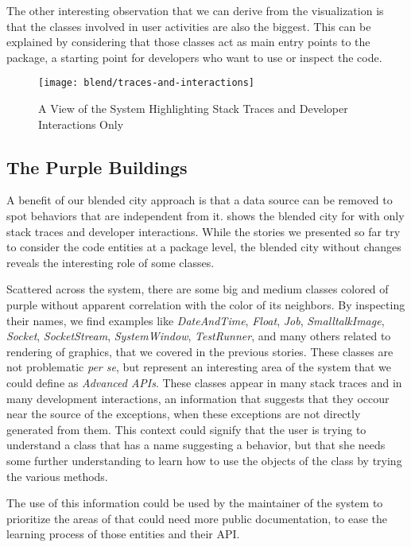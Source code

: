 The other interesting observation that we can derive from the visualization is that the  classes involved in user activities are also the biggest.
This can be explained by considering that those classes act as main entry points to the package, a starting point for developers who want to use or inspect the code.


\begin{figure*}[ht]
\centering
\texttt{[image: blend/traces-and-interactions]}
\caption{A View of the System Highlighting Stack Traces and Developer Interactions Only}
\label{fig:traces-and-interactions}
\end{figure*}

\subsection{The Purple Buildings}

A benefit of our blended city approach is that a data source can be removed to spot behaviors that are independent from it.
 shows the blended city for \pha with only stack traces and developer interactions.
While the stories we presented so far try to consider the code entities at a package level,  the blended city without changes reveals the interesting role of some classes.

 Scattered across the system, there are some big and medium classes colored of purple without apparent correlation with the color of its neighbors.
By inspecting their names, we find examples like \textit{DateAndTime}, \textit{Float}, \textit{Job}, \textit{SmalltalkImage}, \textit{Socket}, \textit{SocketStream},  \textit{SystemWindow}, \textit{TestRunner}, and many others related to rendering of graphics, that we covered in the previous stories.
These classes are not problematic \emph{per se}, but represent an interesting area of the system that we could define as \emph{Advanced APIs}.
These classes appear in many stack traces and in many development interactions, an information that suggests that they occour near the source of the exceptions, when these exceptions are not directly generated from them.
This context could signify that the user is trying to understand a class that has a name suggesting a behavior, but that she needs some further understanding to learn how to use the objects of the class by trying the various methods.

The use of this information could be used by the maintainer of the system to prioritize the areas of that could need more public documentation, to ease the learning process of those entities and their API.

